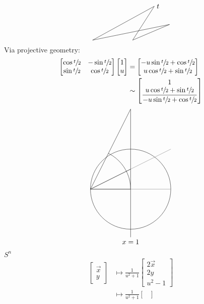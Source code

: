 \documentclass{scrartcl}
\begin{document}
\begin{multicols*}{2}
\[\begin{tikzpicture}[scale=2]
      \def\B{1}
      \coordinate (P) at ({cos(\A r)},{sin(\A r)});
      \coordinate (P2) at ({cos(\B r)},{sin(\B r)});
      \draw (-1,0) -- (P) (0,0)--(P);
      \draw (-1,0) -- (P2) (0,0)--(P2);
      \node[ right] () at  (P2) {\(t\)};
    \end{tikzpicture}
  \]
  Via projective geometry:
  \begin{align*}
    \begin{bmatrix}
     \cos \sfrac t2 & -\sin \sfrac t2 \\
     \sin \sfrac t2 & \cos \sfrac t2
    \end{bmatrix}
    \begin{bmatrix}
      1 \\ u
    \end{bmatrix}
    &=
      \begin{bmatrix}
        -u\sin\sfrac t2 + \cos \sfrac t2 \\
        u \cos \sfrac t2  + \sin \sfrac t2
      \end{bmatrix} \\
    &\sim
      \begin{bmatrix}
        1 \\
        \dfrac{u \cos \sfrac t2  + \sin \sfrac t2}{-u\sin\sfrac t2 + \cos \sfrac t2}
      \end{bmatrix}
  \end{align*}
  \[
    \begin{tikzpicture}[scale=2]
      \draw (1,-1.2) coordinate[label=below:{\(x=1\)}] -- (1,2);
      \draw (1,0) circle (1);
      \draw[gray] (0,0) -- (2,0);
      \draw (0,0) -- (1,0);
      \draw[gray] (0,0) -- (2,1);
      \draw (0,0) -- (1,.5);
      \draw (0,0) -- (1,2);
      \begin{scope}
        \clip (0,0) -- (1,2) -- (1,0) -- cycle;
        \draw (0,0) circle (1);
      \end{scope}
    \end{tikzpicture}
  \]
  \(S^n\)
  \begin{align*}
    \begin{bmatrix}
      \vec x \\y
    \end{bmatrix}
    &\mapsto \frac{1}{u^2+1}
      \begin{bmatrix}
        2\vec x \\ 2y \\ u^2-1
      \end{bmatrix} \\
    &\mapsto \frac{1}{u^2+1}
      \begin{bmatrix}

\end{bmatrix}
\end{align*}
\end{multicols*}
\end{document}
